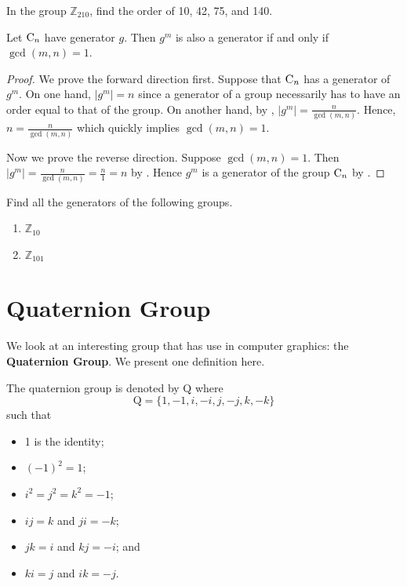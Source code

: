 \begin{exercise}
    In the group $\mathbb{Z}_{210}$, find the order of 10, 42, 75, and 140.
\end{exercise}

\begin{corollary}\label{corollary-element-in-cyclic-group-is-generator-iff-gcd-is-1}
    Let $\mathrm{C}_{n}$ have generator $g$. Then $g^m$ is also a generator if and only if $\gcd(m, n) = 1$.
\end{corollary}
\begin{proof}
    We prove the forward direction first. Suppose that $\mathrm{C}_{n}$ has a generator of $g^m$. On one hand, $|g^m| = n$ since a generator of a group necessarily has to have an order equal to that of the group. On another hand, by , $|g^m| = \frac{n}{\gcd(m, n)}$. Hence, $n = \frac{n}{\gcd(m, n)}$ which quickly implies $\gcd(m, n) = 1$.

    Now we prove the reverse direction. Suppose $\gcd(m,n) = 1$. Then $|g^m| = \frac{n}{\gcd(m,n)} = \frac{n}{1} = n$ by . Hence $g^m$ is a generator of the group $\mathrm{C}_{n}$ by .
\end{proof}

\begin{exercise}
    Find all the generators of the following groups.
    \begin{enumerate}[label=(\alph*)]
        \item $\mathbb{Z}_{10}$
        \item $\mathbb{Z}_{101}$
    \end{enumerate}
\end{exercise}

\section{Quaternion Group}
We look at an interesting group that has use in computer graphics: the \textbf{Quaternion Group}. We present one definition here.
\begin{definition}
    The quaternion group is denoted by $\mathrm{Q}$ where
    \[
            \mathrm{Q} = \{1, -1, i, -i, j, -j, k, -k\}
    \]
    such that
    \begin{itemize}
        \item 1 is the identity;
        \item $(-1)^2 = 1$;
        \item $i^2 = j^2 = k^2 = -1$;
        \item $ij = k$ and $ji = -k$;
        \item $jk = i$ and $kj = -i$; and
        \item $ki = j$ and $ik = -j$.
    \end{itemize}
\end{definition}

